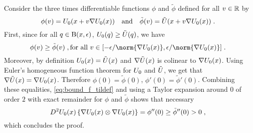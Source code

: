 Consider the three times differentiable functions $\phi$ and $\tilde{\phi}$
defined for all $v \in \mathbb{R}$ by
$$
\phi(v)=U_0(x+v \nabla U_0(x))\quad\textrm{and}\quad \tilde{\phi}(v)= \tilde{U}(x+v \nabla U_0(x)) \;.
$$
First, since for all $q \in \operatorname{B}(x,\epsilon)$, $U_0(q) \geq \tilde{U}(q)$, we have
\begin{equation}
  \label{eq:bound_f_tildef}
  \phi(v) \geq \tilde{\phi}(v) \eqsp, \text{for all $v \in \ccint{-\epsilon/\norm{\nabla \F_0(\x)},\epsilon/\norm{\nabla \F_0(\x)}}$}\eqsp.
\end{equation}
Moreover, by definition $U_0(x) = \tilde{U}(x)$ and $\nabla \tilde{U}(x)$
is colinear to $ \nabla U_0(x)$. Using  Euler's homogeneous function theorem for $U_0$
and $\tilde{U}$, we get that $\nabla \tilde{U}(x) = \nabla
U_0(x)$. Therefore $\phi(0) = \tilde{\phi}(0)$, $\phi'(0) = \tilde{\phi}'(0)$. Combining these equalities, \eqref{eq:bound_f_tildef} and using a Taylor expansion around $0$ of order $2$ with exact remainder for $\phi$ and $\tilde{\phi}$ shows that necessary
\begin{equation}
  D^2U_0(x)\left\lbrace \nabla
  U_0(x)\otimes \nabla U_0(x) \right\rbrace =   \phi''(0) \geq \tilde{\phi}''(0) >0 \;,
\end{equation}
which concludes the proof.
